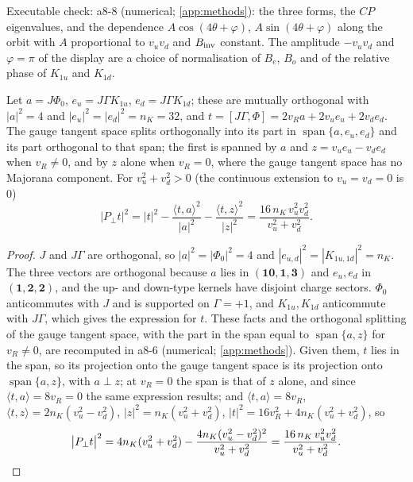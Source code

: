 \noindent Executable check: a8-8 (numerical; \cref{app:methods}): the three forms, the $CP$ eigenvalues, and the dependence $A\cos(4\theta+\varphi)$,
$A\sin(4\theta+\varphi)$ along the orbit with $A$ proportional to $v_uv_d$ and $B_{\rm inv}$ constant. The amplitude $-v_uv_d$ and $\varphi=\pi$ of the
display are a choice of normalisation of $B_e$, $B_o$ and of the relative phase of $K_{1u}$ and $K_{1d}$.

\begin{theorem}
\label{thm:mA}
Let $a=J\Phi_0$, $e_u=J\Gamma K_{1u}$, $e_d=J\Gamma K_{1d}$; these are mutually orthogonal with $|a|^2=4$ and $|e_u|^2=|e_d|^2=n_K=32$, and
$t=[J\Gamma,\Phi]=2v_Ra+2v_ue_u+2v_de_d$. The gauge tangent space splits orthogonally into its part in $\operatorname{span}\{a,e_u,e_d\}$ and its part
orthogonal to that span; the first is spanned by $a$ and $z=v_ue_u-v_de_d$ when $v_R\neq0$, and by $z$ alone when $v_R=0$, where the gauge tangent space
has no Majorana component. For $v_u^2+v_d^2>0$ (the continuous extension to $v_u=v_d=0$ is $0$)
\[
\bigl|P_\perp t\bigr|^2=|t|^2-\frac{\langle t,a\rangle^2}{|a|^2}-\frac{\langle t,z\rangle^2}{|z|^2}=\frac{16\,n_K\,v_u^2v_d^2}{v_u^2+v_d^2}.
\]
\end{theorem}

\begin{proof}
$J$ and $J\Gamma$ are orthogonal, so $|a|^2=|\Phi_0|^2=4$ and $|e_{u,d}|^2=|K_{1u,1d}|^2=n_K$. The three vectors are orthogonal because $a$ lies in
$(\mathbf{10},\mathbf1,\mathbf3)$ and $e_u,e_d$ in $(\mathbf1,\mathbf2,\mathbf2)$, and the up- and down-type kernels have disjoint charge sectors. $\Phi_0$
anticommutes with $J$ and is supported on $\Gamma=+1$, and $K_{1u},K_{1d}$ anticommute with $J\Gamma$, which gives the expression for $t$. These facts and
the orthogonal splitting of the gauge tangent space, with the part in the span equal to $\operatorname{span}\{a,z\}$ for $v_R\neq0$, are recomputed in a8-6
(numerical; \cref{app:methods}). Given them, $t$ lies in the span, so its projection onto the gauge tangent space is its projection onto $\operatorname{span}\{a,z\}$,
with $a\perp z$; at $v_R=0$ the span is that of $z$ alone, and since $\langle t,a\rangle=8v_R=0$ the same expression results; and $\langle t,a\rangle=8v_R$, $\langle t,z\rangle=2n_K(v_u^2-v_d^2)$, $|z|^2=n_K(v_u^2+v_d^2)$, $|t|^2=16v_R^2+4n_K(v_u^2+v_d^2)$, so
\[
\bigl|P_\perp t\bigr|^2=4n_K(v_u^2+v_d^2)-\frac{4n_K(v_u^2-v_d^2)^2}{v_u^2+v_d^2}=\frac{16\,n_K\,v_u^2v_d^2}{v_u^2+v_d^2}.\qedhere
\]
\end{proof}

